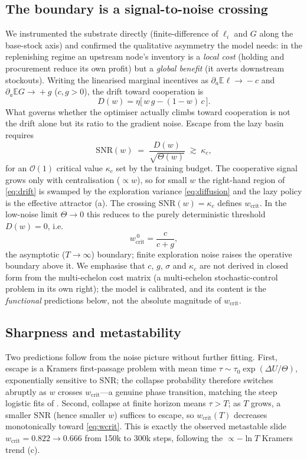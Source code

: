 \documentclass[11pt]{article}
\newcommand{\wcrit}{w_{\mathrm{crit}}}
\begin{document}
\subsection{The boundary is a signal-to-noise crossing}
We instrumented the substrate directly (finite-difference of $\ell_i$ and
$G$ along the base-stock axis) and confirmed the qualitative asymmetry the
model needs: in the replenishing regime an upstream node's inventory is a
\emph{local cost} (holding and procurement reduce its own profit) but a
\emph{global benefit} (it averts downstream stockouts). Writing the
linearised marginal incentives as $\partial_a\mathbb{E}\ell\!\to\!-c$ and
$\partial_a\mathbb{E}G\!\to\!+g$ ($c,g>0$), the drift toward cooperation is
\begin{equation}
  D(w)=\eta\big[\,w\,g-(1-w)\,c\,\big].
  \label{eq:drift}
\end{equation}
What governs whether the optimiser actually climbs toward cooperation is
not the drift alone but its ratio to the gradient noise. Escape from the
lazy basin requires
\begin{equation}
  \mathrm{SNR}(w)\;=\;\frac{D(w)}{\sqrt{\Theta(w)}}\;\gtrsim\;\kappa_c ,
  \label{eq:snr}
\end{equation}
for an $\mathcal{O}(1)$ critical value $\kappa_c$ set by the training
budget. The cooperative signal grows only with centralisation
($\propto w$), so for small $w$ the right-hand region of \eqref{eq:drift}
is swamped by the exploration variance \eqref{eq:diffusion} and the lazy
policy is the effective attractor (a). The crossing
$\mathrm{SNR}(w)=\kappa_c$ defines $\wcrit$. In the low-noise limit
$\Theta\!\to\!0$ this reduces to the purely deterministic threshold
$D(w)=0$, i.e.
\begin{equation}
  \wcrit^{\,0}=\frac{c}{c+g},
  \label{eq:wcrit}
\end{equation}
the asymptotic ($T\!\to\!\infty$) boundary; finite exploration noise raises
the operative boundary above it. We emphasise that $c$, $g$, $\sigma$ and
$\kappa_c$ are not derived in closed form from the multi-echelon cost
matrix (a multi-echelon stochastic-control problem in its own right); the
model is calibrated, and its content is the \emph{functional} predictions
below, not the absolute magnitude of $\wcrit$.

\subsection{Sharpness and metastability}
Two predictions follow from the noise picture without further fitting.
First, escape is a Kramers first-passage problem with mean time
$\tau\sim\tau_0\exp(\Delta U/\Theta)$, exponentially sensitive to
$\mathrm{SNR}$; the collapse probability therefore switches abruptly as $w$
crosses $\wcrit$---a genuine phase transition, matching the steep logistic
fits of . Second, collapse at finite horizon
means $\tau>T$; as $T$ grows, a smaller $\mathrm{SNR}$ (hence smaller $w$)
suffices to escape, so $\wcrit(T)$ decreases monotonically toward
\eqref{eq:wcrit}. This is exactly the observed metastable slide
$\wcrit=0.822\!\to\!0.666$ from 150k to 300k steps, following the
$\propto-\ln T$ Kramers trend (c).
\end{document}
